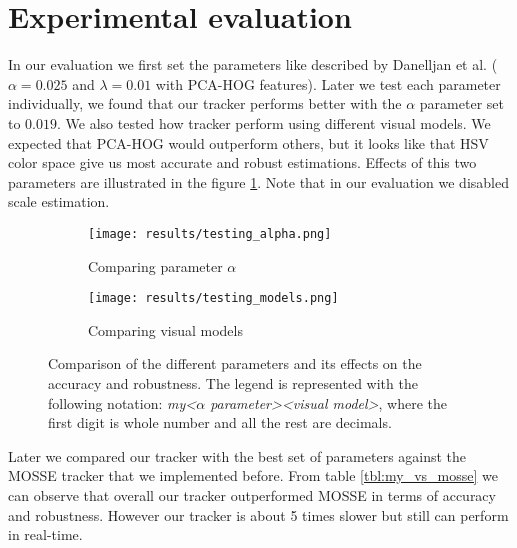 \documentclass[runningheads]{llncs}
\begin{document}
\section{Experimental evaluation}
\label{sec:experimental_evaluation}

In our evaluation we first set the parameters like described by Danelljan et al. \cite{danelljan2014accurate} ($\alpha=0.025$ and $\lambda=0.01$ with PCA-HOG features). Later we test each parameter individually, we found that our tracker performs better with the $\alpha$ parameter set to $0.019$. We also tested how tracker perform using different visual models. We expected that PCA-HOG would outperform others, but it looks like that HSV color space give us most accurate and robust estimations. Effects of this two parameters are illustrated in the figure \ref{fig:parameters}. Note that in our evaluation we disabled scale estimation.

\begin{figure}
    \centering

    \begin{subfigure}{0.48\textwidth}
        \centering
        \texttt{[image: results/testing\_alpha.png]}
        \caption{Comparing parameter $\alpha$}
    \end{subfigure}
    \hspace*{\fill}
    \begin{subfigure}{0.48\textwidth}
        \centering
        \texttt{[image: results/testing\_models.png]}
        \caption{Comparing visual models}
    \end{subfigure}
    
    \caption{Comparison of the different parameters and its effects on the accuracy and robustness.
    \newline
    \newline
    The legend is represented with the following notation: \newline
    \textit{my\textunderscore\textless $\alpha$ parameter\textgreater\textunderscore\textless visual model\textgreater}, where the first digit is whole number and all the rest are decimals.}
    \label{fig:parameters}
\end{figure}

Later we compared our tracker with the best set of parameters against the MOSSE tracker that we implemented before. From table \ref{tbl:my_vs_mosse} we can observe that overall our tracker outperformed MOSSE in terms of accuracy and robustness. However our tracker is about 5 times slower but still can perform in real-time.
\end{document}
